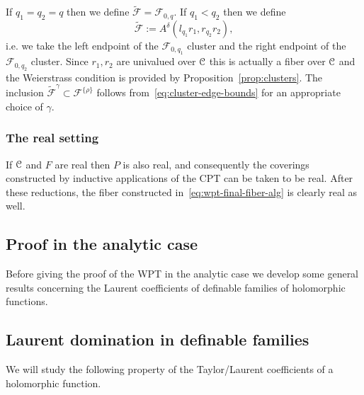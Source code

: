 \documentclass[reqno]{amsart}
\renewcommand\~[1]{\widetilde{#1}}
\def\cF{{\mathcal F}} \def\cL{{\mathcal L}} \def\cR{{\mathcal R}}
\def\he#1{{\{#1\}}}
\def\hrho{{\he\rho}}
\begin{document}
If $q_1=q_2=q$ then we define $\tilde\cF=\cF_{0,q}$. If $q_1<q_2$ then we define
\begin{equation}\label{eq:wpt-final-fiber-alg}
  \tilde\cF:= A^\delta(l_{q_1}r_1,r_{q_2}r_2),
\end{equation}
i.e. we take the left endpoint of the $\cF_{0,q_1}$ cluster and the
right endpoint of the $\cF_{0,q_2}$ cluster. Since $r_1,r_2$ are
univalued over ${\mathcal C}$ this is actually a fiber over ${\mathcal C}$ and the
Weierstrass condition is provided by Proposition~\ref{prop:clusters}.
The inclusion $\tilde\cF^\gamma\subset\cF^\hrho$ follows
from~\eqref{eq:cluster-edge-bounds} for an appropriate choice of
$\gamma$.

\subsubsection{The real setting}

If ${\mathcal C}$ and $F$ are real then $P$ is also real, and consequently the
coverings constructed by inductive applications of the CPT can be
taken to be real. After these reductions, the fiber constructed
in~\eqref{eq:wpt-final-fiber-alg} is clearly real as well.

\subsection{Proof in the analytic case}

Before giving the proof of the WPT in the analytic case we develop
some general results concerning the Laurent coefficients of definable
families of holomorphic functions.

\subsection{Laurent domination in definable families}
\label{sec:laurent-domination}

We will study the following property of the Taylor/Laurent
coefficients of a holomorphic function.
\end{document}
